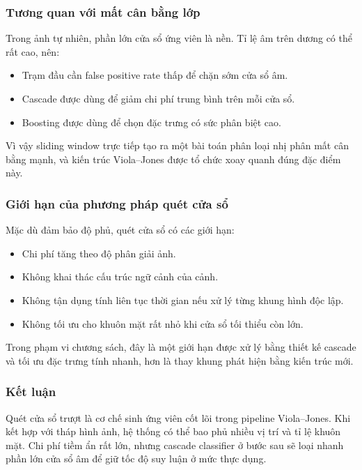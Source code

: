 \subsubsection{Tương quan với mất cân bằng lớp}

Trong ảnh tự nhiên, phần lớn cửa sổ ứng viên là nền.
Tỉ lệ âm trên dương có thể rất cao, nên:
\begin{itemize}
  \item Trạm đầu cần false positive rate thấp để chặn sớm cửa sổ âm.
  \item Cascade được dùng để giảm chi phí trung bình trên mỗi cửa sổ.
  \item Boosting được dùng để chọn đặc trưng có sức phân biệt cao.
\end{itemize}
Vì vậy sliding window trực tiếp tạo ra một bài toán phân loại nhị phân mất cân bằng mạnh, và kiến trúc Viola--Jones được tổ chức xoay quanh đúng đặc điểm này.  \cite{viola2001rapid,viola2004robust}

\subsubsection{Giới hạn của phương pháp quét cửa sổ}

Mặc dù đảm bảo độ phủ, quét cửa sổ có các giới hạn:
\begin{itemize}
  \item Chi phí tăng theo độ phân giải ảnh.
  \item Không khai thác cấu trúc ngữ cảnh của cảnh.
  \item Không tận dụng tính liên tục thời gian nếu xử lý từng khung hình độc lập.
  \item Không tối ưu cho khuôn mặt rất nhỏ khi cửa sổ tối thiểu còn lớn.
\end{itemize}
Trong phạm vi chương sách, đây là một giới hạn được xử lý bằng thiết kế cascade và tối ưu đặc trưng tính nhanh, hơn là thay khung phát hiện bằng kiến trúc mới.

\subsubsection{Kết luận}

Quét cửa sổ trượt là cơ chế sinh ứng viên cốt lõi trong pipeline Viola--Jones.
Khi kết hợp với tháp hình ảnh, hệ thống có thể bao phủ nhiều vị trí và tỉ lệ khuôn mặt.
Chi phí tiềm ẩn rất lớn, nhưng cascade classifier ở bước sau sẽ loại nhanh phần lớn cửa sổ âm để giữ tốc độ suy luận ở mức thực dụng.  \cite{viola2001rapid,viola2004robust,li2012facechapter}

